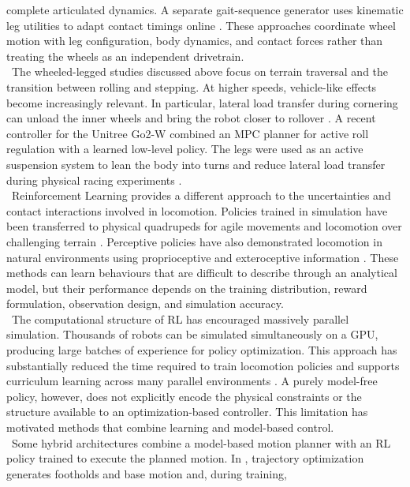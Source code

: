complete articulated dynamics. A separate gait-sequence generator uses
kinematic leg utilities to adapt contact timings online
\cite{wheeled_whole_body_mpc}. These approaches coordinate wheel motion with
leg configuration, body dynamics, and contact forces rather than treating the
wheels as an independent drivetrain.\\
\
The wheeled-legged studies discussed above focus on terrain traversal and the
transition between rolling and stepping. At higher speeds, vehicle-like
effects become increasingly relevant. In particular, lateral load transfer
during cornering can unload the inner wheels and bring the robot closer to
rollover \cite{racing}. A recent controller for the Unitree
Go2-W combined an MPC planner for active roll regulation with a learned
low-level policy. The legs were used as an active suspension system to lean the
body into turns and reduce lateral load transfer during physical racing
experiments \cite{racing}.\\
\
Reinforcement Learning provides a different approach to the uncertainties and
contact interactions involved in locomotion. Policies trained in simulation
have been transferred to physical quadrupeds for agile movements and locomotion
over challenging terrain \cite{agile_motor_skills,challenging_terrain}.
Perceptive policies have also demonstrated locomotion in natural environments
using proprioceptive and exteroceptive information
\cite{perceptive_rl}. These methods can learn behaviours that are difficult to
describe through an analytical model, but their performance depends on the
training distribution, reward formulation, observation design, and simulation
accuracy.\\
\
The computational structure of RL has encouraged massively parallel
simulation. Thousands of robots can be simulated simultaneously on a
GPU,
producing large batches of experience for policy optimization. This approach
has substantially reduced the time required to train locomotion policies and
supports curriculum learning across many parallel environments
\cite{parallel_rl}. A purely model-free policy, however, does not explicitly
encode the physical constraints or the structure available to an
optimization-based controller. This limitation has motivated methods that
combine learning and model-based control.\\
\
Some hybrid architectures combine a model-based motion planner with an RL
policy trained to execute the planned motion. In \cite{deep_tracking},
trajectory optimization generates footholds and base motion and, during training,
